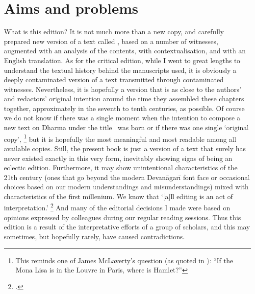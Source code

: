 \documentclass[11pt]{book}
\begin{document}

\vfill
\pagebreak




\section{Aims and problems}
\frenchspacing

\noindent
What is this edition? It is not much more than
 a new copy, and carefully prepared new version
of a text called \Vss, based on a number of witnesses,
augmented with an analysis of the contents, with
contextualisation, and with an English translation.
As for the critical edition, while I went to great 
lengths to understand the textual history behind 
the manuscripts used, it is obviously a deeply contaminated 
version of a text transmitted through contaminated witnesses.
Nevertheless, it is hopefully a version that is as 
close to the authors' and redactors' original intention
around the time they assembled these chapters together, 
approximately in the seventh to tenth centuries, as possible. 
Of course we do not know if there was a single moment
when the intention to compose a new text on Dharma
under the title \Vss\ was born or if there was one single
`original copy',%
		\footnote{This reminds one of James McLaverty's
				         question (as quoted in 
   				        ):
				``If the Mona Lisa is in the Louvre in Paris, where is Hamlet?''}
but it is hopefully the most meaningful and most readable
among all available copies. Still, the present book is just a
version of a text that surely has never existed exactly 
in this very form, inevitably showing
signs of being an eclectic edition. 
Furthermore, it may show unintentional 
characteristics of the 21th century 
(ones that go beyond the modern Devanāgarī font face
or occasional choices based on our modern understandings and
misunderstandings) 
mixed with characteristics of the first millenium. 
We know that `[a]ll editing is an act of interpretation.'%
		\footnote{.}
And many of the editorial decisions I made were based
on opinions expressed by colleagues during our
regular reading sessions. Thus this edition is a result
of the interpretative efforts of a group of scholars, and
this may sometimes, but hopefully rarely, have caused contradictions.
\end{document}
